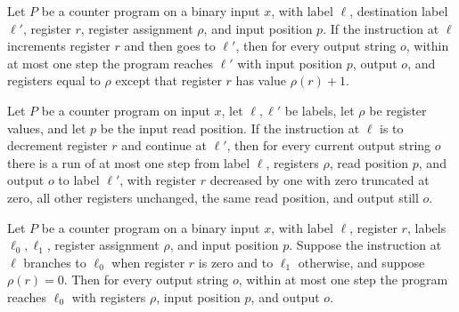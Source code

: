 \begin{theorem}
\label{Complexity.CounterProg.goes_inc}
\leanok
{}
Let $P$ be a counter program on a binary input $x$, with label $\ell$, destination label
$\ell'$, register $r$, register assignment $\rho$, and input position $p$. If the
instruction at $\ell$ increments register $r$ and then goes to $\ell'$, then for every
output string $o$, within at most one step the program reaches $\ell'$ with input
position $p$, output $o$, and registers equal to $\rho$ except that register $r$ has
value $\rho(r)+1$.
\end{theorem}

\begin{theorem}
\label{Complexity.CounterProg.goes_dec}
\leanok
{}
Let $P$ be a counter program on input $x$, let $\ell,\ell'$ be labels, let $\rho$ be
register values, and let $p$ be the input read position. If the instruction at $\ell$ is
to decrement register $r$ and continue at $\ell'$, then for every current output string
$o$ there is a run of at most one step from label $\ell$, registers $\rho$, read
position $p$, and output $o$ to label $\ell'$, with register $r$ decreased by one with
zero truncated at zero, all other registers unchanged, the same read position, and
output still $o$.
\end{theorem}

\begin{theorem}
\label{Complexity.CounterProg.goes_jz_zero}
\leanok
{}
Let $P$ be a counter program on a binary input $x$, with label $\ell$, register $r$,
labels $\ell_0,\ell_1$, register assignment $\rho$, and input position $p$. Suppose the
instruction at $\ell$ branches to $\ell_0$ when register $r$ is zero and to $\ell_1$
otherwise, and suppose $\rho(r)=0$. Then for every output string $o$, within at most one
step the program reaches $\ell_0$ with registers $\rho$, input position $p$, and output
$o$.
\end{theorem}

